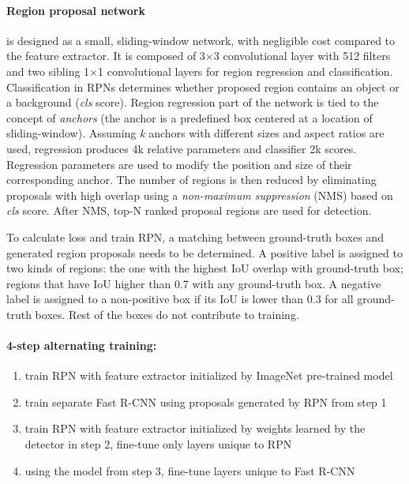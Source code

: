  \paragraph{Region proposal network} is designed as a small, sliding-window network, with negligible cost compared to the feature extractor. It is composed of 3$\times$3 convolutional layer with 512 filters and two sibling 1$\times$1 convolutional layers for region regression and classification. Classification in RPNs determines whether proposed region contains an object or a background (\textit{cls} score). Region regression part of the network is tied to the concept of \textit{anchors} (the anchor is a predefined box centered at a location of sliding-window). Assuming \textit{k} anchors with different sizes and aspect ratios are used, regression produces 4k relative parameters and classifier 2k scores. Regression parameters are used to modify the position and size of their corresponding anchor. The number of regions is then reduced by eliminating proposals with high overlap using a \textit{non-maximum suppression} (NMS) based on \textit{cls} score. After NMS, top-N ranked proposal regions are used for detection.
 
 To calculate loss and train RPN, a matching between ground-truth boxes and generated region proposals needs to be determined. A positive label is assigned to two kinds of regions: the one with the highest IoU overlap with ground-truth box; regions that have IoU higher than 0.7 with any ground-truth box. A negative label is assigned to a non-positive box if its IoU is lower than 0.3 for all ground-truth boxes. Rest of the boxes do not contribute to training. 
 
 \paragraph{4-step alternating training:}
 
 \begin{enumerate}
     \item train RPN with feature extractor initialized by ImageNet pre-trained model
     \item train separate Fast R-CNN using proposals generated by RPN from step 1
     \item train RPN with feature extractor initialized by weights learned by the detector in step 2, fine-tune only layers unique to RPN
     \item using the model from step 3, fine-tune layers unique to Fast R-CNN
 \end{enumerate}

